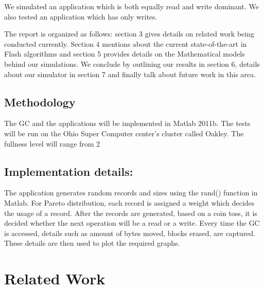 We simulated an application which is both equally read and write dominant. We also tested an application which has only writes.

The report is organized as follows: section 3 gives details on related work being conducted currently. Section 4 mentions about the current state-of-the-art in Flash algorithms and section 5 provides details on the Mathematical models behind our simulations. We conclude by outlining our results in section 6, details about our simulator in section 7 and finally talk about future work in this area.

\subsection{Methodology}
The GC and the applications will be implemented in Matlab 2011b. The tests will be run on the Ohio Super Computer center’s cluster called Oakley. The fullness level will range from 2%

\subsection*{Implementation details:}
The application generates random records and sizes using the rand() function in Matlab. For Pareto distribution, each record is assigned a weight which decides the usage of a record. After the records are generated, based on a coin toss, it is decided whether the next operation will be a read or a write. Every time the GC is accessed, details such as amount of bytes moved, blocks erased, are captured. These details are then used to plot the required graphs. 

\section{Related Work}


